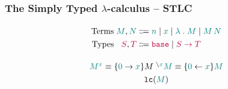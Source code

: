 \newcommand{\subst}[2]{\ensuremath{[{#1}/{#2}]}}

\newcommand{\eoft}[3]{\ensuremath{\vex{#1}\mathrel{\vdash_e} \dexp{#2}\oft\dte{#3}}}

\newcommand{\poft}[3]{\ensuremath{\dexp{#1}\vdash\dproc{#2}\oft\dproc{#3}}}
\newcommand{\poftG}[2]{\poft{\Gamma}{#1}{#2}}

\newcommand{\completed}[1]{\ensuremath{\texttt{completed}(\vch{#1})}}

\newcommand{\pcompose}[2]{\ensuremath{\vch{#1}\mathrel{\circ}\vch{#2}}}
\newcommand{\pcompatible}[2]{\ensuremath{\vch{#1}\mathrel{\asymp}\vch{#2}}}




\begin{frame}
  \frametitle{The Simply Typed $\lambda$-calculus -- STLC}

\begin{displaymath}
  \arraycolsep=1.4pt\def\arraystretch{1.3}
  \begin{array}{rrcl}
    \text{Terms} & \dexp M, \dexp N & \bnfas & \bvar n \bnfalt \fvar x \bnfalt \lam M \bnfalt \app M N\\
    \text{Types} & \dte S, \dte T & \bnfas & \base \bnfalt \arr S T\\
  \end{array}
\end{displaymath}


\begin{displaymath}
  \arraycolsep=1.4pt\def\arraystretch{1.3}
  \begin{array}{cc}
    \openop {\dexp M} {\vex x} \equiv \{\vex 0 \rightarrow \vex x\} M & \closeop {\dexp M} {\vex x} \equiv \{\vex 0 \leftarrow \vex x\} \dexp M \\
    \multicolumn{2}{c}{\lclosed {\dexp M}}\\
  \end{array}
\end{displaymath}


\end{frame}


